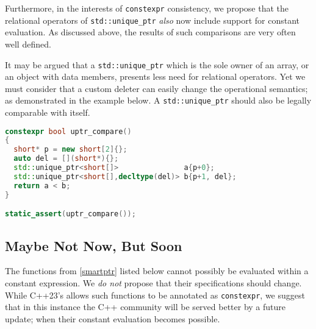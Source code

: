 \documentclass[10pt]{article}
\newcommand*{\wgxxi}[1]{[\href{https://wg21.link/#1}{#1}]}
\begin{document}
Furthermore, in the interests of \texttt{constexpr} consistency, we propose
that the relational operators of \texttt{std::unique\_ptr} \emph{also} now
include support for constant evaluation. As discussed above, the results of
such comparisons are very often well defined.

It may be argued that a \texttt{std::unique\_ptr} which is the sole owner of an
array, or an object with data members, presents less need for relational
operators. Yet we must consider that a custom deleter can easily change the
operational semantics; as demonstrated in the example below. A
\texttt{std::unique\_ptr} should also be legally comparable with itself.

\begin{lstlisting}[language=cpp]
constexpr bool uptr_compare()
{
  short* p = new short[2]{};
  auto del = [](short*){};
  std::unique_ptr<short[]>               a{p+0};
  std::unique_ptr<short[],decltype(del)> b{p+1, del};
  return a < b;
}

static_assert(uptr_compare());
\end{lstlisting}

\subsection{Maybe Not Now, But Soon}
\label{sec:mnnbs}

The functions from \wgxxi{smartptr} listed below cannot possibly be evaluated
within a constant expression. We \emph{do not} propose that their
specifications should change. While C++23's \cite{P2448R2} allows such
functions to be annotated as \texttt{constexpr}, we suggest that in this
instance the C++ community will be served better by a future update; when their
constant evaluation becomes possible.
\end{document}
